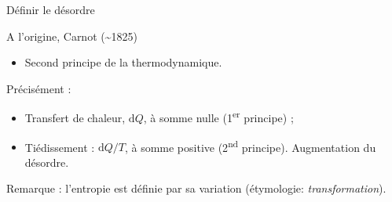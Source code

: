 \documentclass[ignorenonframetext,]{beamer}
\providecommand{\tightlist}{%
  \setlength{\itemsep}{0pt}\setlength{\parskip}{0pt}}
\begin{document}
\begin{frame}{Définir le désordre}

A l'origine, Carnot (\textasciitilde{}1825)

\begin{itemize}
\tightlist
\item
  Second principe de la thermodynamique.
\end{itemize}

Précisément :

\begin{itemize}
\item
  Transfert de chaleur, \(\mathrm{d}Q\), à somme nulle
  (1\textsuperscript{er} principe) ;
\item
  Tiédissement : \(\mathrm{d}Q/T\), à somme positive
  (2\textsuperscript{nd} principe). Augmentation du désordre.
\end{itemize}

Remarque : l'entropie est définie par sa variation (étymologie:
\emph{transformation}).

\end{frame}
\end{document}
